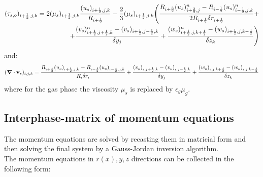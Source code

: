 %
\begin{eqnarray}
\htmlimage{}
(\tau_{s,o})_{i+\frac{1}{2},j,k} = 2 (\mu_s)_{i+\frac{1}{2},j,k} 
\frac{(u_s)_{i+\frac{1}{2},j,k}}
{R_{i+\frac{1}{2}}} -
\frac{2}{3} (\mu_s)_{i+\frac{1}{2},j,k}
\Bigg( \frac{R_{i+\frac{3}{2}} (u_s)_{i+\frac{3}{2},j}^{n} - 
R_{i-\frac{1}{2}} (u_s)_{i-\frac{1}{2},j,k}^{n}}
{2 R_{i+\frac{1}{2}} \delta r_{i+\frac{1}{2}}} + \nonumber \\
+ \frac{(v_s)_{i+\frac{1}{2},j+\frac{1}{2},k}^{n} - 
(v_s)_{i+\frac{1}{2},j-\frac{1}{2},k}}
{\delta y_j}
+ \frac{(w_s)_{i+\frac{1}{2},j,k+\frac{1}{2}}^{n} - 
(w_s)_{i+\frac{1}{2},j,k-\frac{1}{2}}}
{\delta z_k} \Bigg)
\nonumber
\end{eqnarray}
%
and:
%
\begin{eqnarray}
\htmlimage{}
(\mbox{\boldmath $\nabla$} \cdot {\bf v}_s)_{i,j,k} = 
\frac{R_{i+\frac{1}{2}} (u_s)_{i+\frac{1}{2},j,k} - 
R_{i-\frac{1}{2}} (u_s)_{i-\frac{1}{2},j,k}} {R_{i} \delta r_{i}} + 
\frac{(v_s)_{i,j+\frac{1}{2},k} - (v_s)_{i,j-\frac{1}{2},k}} {\delta y_j}+ 
\frac{(w_s)_{i,j,k+\frac{1}{2}} - (w_s)_{i,j,k-\frac{1}{2}}} {\delta z_k}
\nonumber
\end{eqnarray}
%
where for the gas phase the viscosity $\mu_s$ is replaced 
by $\epsilon_g \mu_g$.\\[3mm]
%
\newpage
%
\subsection{Interphase-matrix of momentum equations}

The momentum equations are solved by recasting them in matricial 
form and then solving  the final system by a Gauss-Jordan inversion algorithm. \\
The momentum equations in $r(x), y, z$ directions can be collected in the following form:

